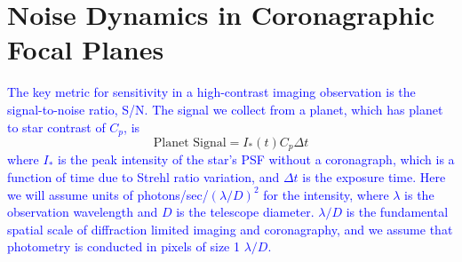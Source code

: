 \documentclass[10pt,preprint]{aastex631}
\newcommand{\jrmadd}[1]{\textcolor{blue}{#1}}
\begin{document}


\section{Noise Dynamics in Coronagraphic Focal Planes}
\label{sec:noise}
\jrmadd{The key metric for sensitivity in a high-contrast imaging observation is the signal-to-noise ratio, S/N.  The signal we collect from a planet, which has planet to star contrast of $C_p$, is }
\begin{equation}
\mbox{Planet Signal} = I_{*}(t) C_p \Delta t
\label{eqn:signal}
\end{equation}
\jrmadd{where $I_{*}$ is the peak intensity of the star's PSF without a coronagraph, which is a function of time due to Strehl ratio variation, and $\Delta t$ is the exposure time.  Here we will assume units of photons/sec/$(\lambda/D)^2$ for the intensity, where $\lambda$ is the observation wavelength and $D$ is the telescope diameter.  $\lambda/D$ is the fundamental spatial scale of diffraction limited imaging and coronagraphy, and we assume that photometry is conducted in pixels of size 1 $\lambda/D$.}
\end{document}
